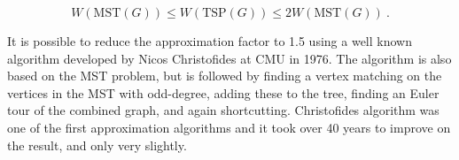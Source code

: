 \[W(\mbox{MST}(G)) \leq W(\mbox{TSP}(G)) \leq 2 W(\mbox{MST}(G))~.\]

\begin{remark}
It is possible to reduce the approximation factor to 1.5 using a well
known algorithm developed by Nicos Christofides at CMU in 1976.  The
algorithm is also based on the MST problem, but is followed by finding
a vertex matching on the vertices in the MST with odd-degree, adding
these to the tree, finding an Euler tour of the combined graph, and
again shortcutting.  Christofides algorithm was one of the first
approximation algorithms and it took over 40 years to improve on the
result, and only very slightly.
\end{remark}




\flushchapter
